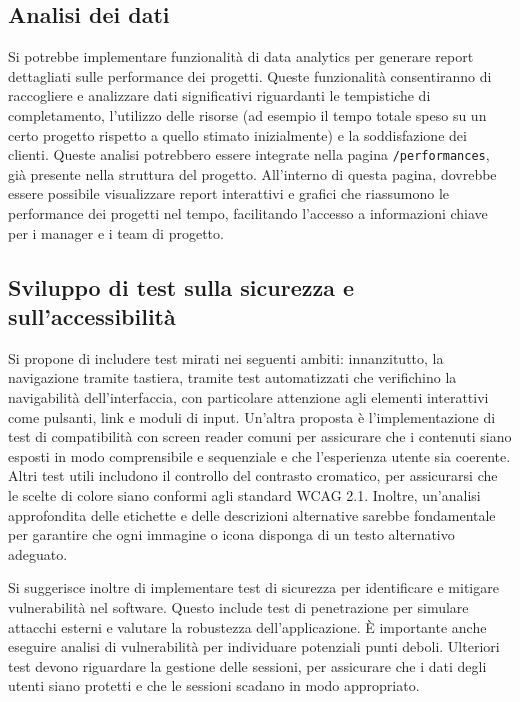 \documentclass[target=bach,aauheader=,style=]{thud}
\begin{document}
\subsection{Analisi dei dati}
Si potrebbe implementare funzionalità di data analytics per generare report dettagliati sulle performance dei progetti. Queste funzionalità consentiranno di raccogliere e analizzare dati significativi riguardanti le tempistiche di completamento, l'utilizzo delle risorse (ad esempio il tempo totale speso su un certo progetto rispetto a quello stimato inizialmente) e la soddisfazione dei clienti. Queste analisi potrebbero essere integrate nella pagina \texttt{/performances}, già presente nella struttura del progetto. All'interno di questa pagina, dovrebbe essere possibile visualizzare report interattivi e grafici che riassumono le performance dei progetti nel tempo, facilitando l'accesso a informazioni chiave per i manager e i team di progetto.

\subsection{Sviluppo di test sulla sicurezza e sull'accessibilità}
Si propone di includere test mirati nei seguenti ambiti: innanzitutto, la navigazione tramite tastiera, tramite test automatizzati che verifichino la navigabilità dell'interfaccia, con particolare attenzione agli elementi interattivi come pulsanti, link e moduli di input. Un'altra proposta è l'implementazione di test di compatibilità con screen reader comuni per assicurare che i contenuti siano esposti in modo comprensibile e sequenziale e che l'esperienza utente sia coerente. Altri test utili includono il controllo del contrasto cromatico, per assicurarsi che le scelte di colore siano conformi agli standard WCAG 2.1\cite{wcag21}. Inoltre, un'analisi approfondita delle etichette e delle descrizioni alternative sarebbe fondamentale per garantire che ogni immagine o icona disponga di un testo alternativo adeguato. 

\noindent Si suggerisce inoltre di implementare test di sicurezza per identificare e mitigare vulnerabilità nel software. Questo include test di penetrazione per simulare attacchi esterni e valutare la robustezza dell'applicazione. È importante anche eseguire analisi di vulnerabilità per individuare potenziali punti deboli. Ulteriori test devono riguardare la gestione delle sessioni, per assicurare che i dati degli utenti siano protetti e che le sessioni scadano in modo appropriato.
\end{document}
